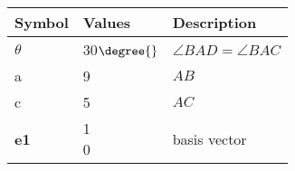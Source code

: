 \begin{tabular}{|p{3cm}|p{3cm}|p{3cm}|}
\hline                                        
\textbf{Symbol} & \textbf{Values} & \textbf{Description}\\                                          
\hline                                 
$\theta$ & 30$\degree{}$   & $\angle{BAD} = \angle{BAC}$ \\           
\hline                                    
a &  9 & $AB$ \\     
\hline                      
c & 5 & $AC$ \\
\hline                                     
	\textbf{e1} & \myvec{
		1\\
		0\\
		} & basis vector\\ 
\hline
\end{tabular}
